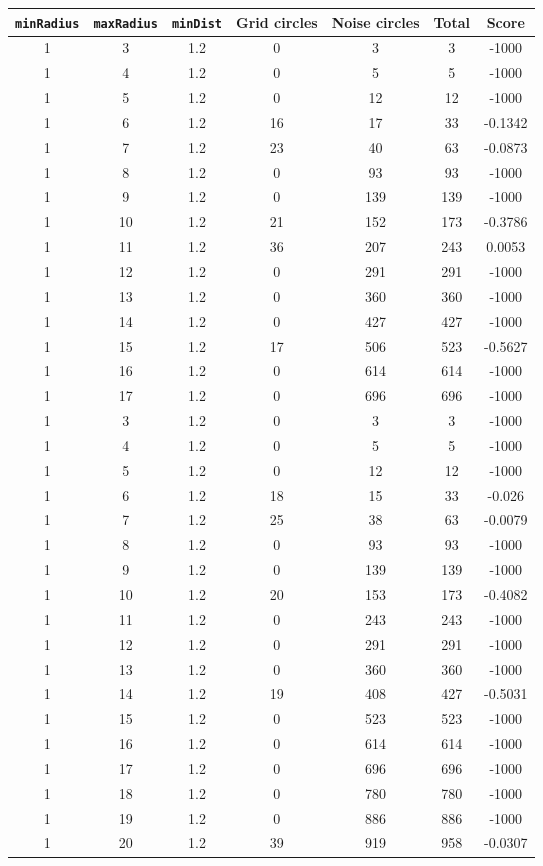 \documentclass[letterpaper, 12pt]{article}
\begin{document}
\begin{longtable}{|c|c|c|c|c|c|c|}
\hline
\textbf{\texttt{minRadius}} & \textbf{\texttt{maxRadius}} & \textbf{\texttt{minDist}} & \textbf{Grid circles} & \textbf{Noise circles} & \textbf{Total} & \textbf{Score} \\
\hline
1 & 3 & 1.2 & 0 & 3 & 3 & -1000 \\
\hline
1 & 4 & 1.2 & 0 & 5 & 5 & -1000 \\
\hline
1 & 5 & 1.2 & 0 & 12 & 12 & -1000 \\
\hline
1 & 6 & 1.2 & 16 & 17 & 33 & -0.1342 \\
\hline
1 & 7 & 1.2 & 23 & 40 & 63 & -0.0873 \\
\hline
1 & 8 & 1.2 & 0 & 93 & 93 & -1000 \\
\hline
1 & 9 & 1.2 & 0 & 139 & 139 & -1000 \\
\hline
1 & 10 & 1.2 & 21 & 152 & 173 & -0.3786 \\
\hline
1 & 11 & 1.2 & 36 & 207 & 243 & 0.0053 \\
\hline
1 & 12 & 1.2 & 0 & 291 & 291 & -1000 \\
\hline
1 & 13 & 1.2 & 0 & 360 & 360 & -1000 \\
\hline
1 & 14 & 1.2 & 0 & 427 & 427 & -1000 \\
\hline
1 & 15 & 1.2 & 17 & 506 & 523 & -0.5627 \\
\hline
1 & 16 & 1.2 & 0 & 614 & 614 & -1000 \\
\hline
1 & 17 & 1.2 & 0 & 696 & 696 & -1000 \\
\hline
1 & 3 & 1.2 & 0 & 3 & 3 & -1000 \\
\hline
1 & 4 & 1.2 & 0 & 5 & 5 & -1000 \\
\hline
1 & 5 & 1.2 & 0 & 12 & 12 & -1000 \\
\hline
1 & 6 & 1.2 & 18 & 15 & 33 & -0.026 \\
\hline
1 & 7 & 1.2 & 25 & 38 & 63 & -0.0079 \\
\hline
1 & 8 & 1.2 & 0 & 93 & 93 & -1000 \\
\hline
1 & 9 & 1.2 & 0 & 139 & 139 & -1000 \\
\hline
1 & 10 & 1.2 & 20 & 153 & 173 & -0.4082 \\
\hline
1 & 11 & 1.2 & 0 & 243 & 243 & -1000 \\
\hline
1 & 12 & 1.2 & 0 & 291 & 291 & -1000 \\
\hline
1 & 13 & 1.2 & 0 & 360 & 360 & -1000 \\
\hline
1 & 14 & 1.2 & 19 & 408 & 427 & -0.5031 \\
\hline
1 & 15 & 1.2 & 0 & 523 & 523 & -1000 \\
\hline
1 & 16 & 1.2 & 0 & 614 & 614 & -1000 \\
\hline
1 & 17 & 1.2 & 0 & 696 & 696 & -1000 \\
\hline
1 & 18 & 1.2 & 0 & 780 & 780 & -1000 \\
\hline
1 & 19 & 1.2 & 0 & 886 & 886 & -1000 \\
\hline
1 & 20 & 1.2 & 39 & 919 & 958 & -0.0307 \\
\hline
\end{longtable}
\end{document}
